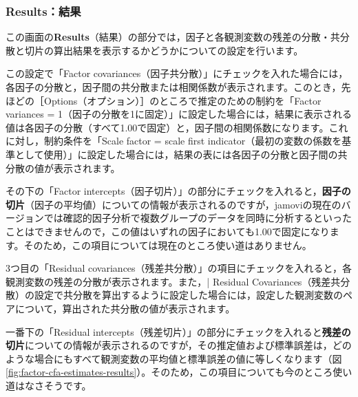 \documentclass[
  12pt,
  a5jpaper,
  lualatex, ja=standard]{bxjsbook}
\begin{document}
\hypertarget{subsub:factor-cfa-covariances}{%
\subsubsection*{Results：結果}\label{subsub:factor-cfa-covariances}}

この画面の\textbf{Results}（結果）の部分では，因子と各観測変数の残差の分散・共分散と切片の算出結果を表示するかどうかについての設定を行います。

この設定で「Factor covariances（因子共分散）」にチェックを入れた場合には，各因子の分散と，因子間の共分散または相関係数が表示されます。このとき，先ほどの［Options（オプション）］のところで推定のための制約を「Factor variances = 1（因子の分散を1に固定）」に設定した場合には，結果に表示される値は各因子の分散（すべて1.00で固定）と，因子間の相関係数になります。これに対し，制約条件を「Scale factor = scale first indicator（最初の変数の係数を基準として使用）」に設定した場合には，結果の表には各因子の分散と因子間の共分散の値が表示されます。

その下の「Factor intercepts（因子切片）」の部分にチェックを入れると，\textbf{因子の切片}（因子の平均値）についての情報が表示されるのですが，jamoviの現在のバージョンでは確認的因子分析で複数グループのデータを同時に分析するといったことはできませんので，この値はいずれの因子においても1.00で固定になります。そのため，この項目については現在のところ使い道はありません。

3つ目の「Residual covariances（残差共分散）」の項目にチェックを入れると，各観測変数の残差の分散が表示されます。また，\colorbox{bar}{\textcolor{gmoji2}{| Residual Covariances}}（残差共分散）の設定で共分散を算出するように設定した場合には，設定した観測変数のペアについて，算出された共分散の値が表示されます。

一番下の「Residual intercepts（残差切片）」の部分にチェックを入れると\textbf{残差の切片}についての情報が表示されるのですが，その推定値および標準誤差は，どのような場合にもすべて観測変数の平均値と標準誤差の値に等しくなります（図\ref{fig:factor-cfa-estimates-results}）。そのため，この項目についても今のところ使い道はなさそうです。
\end{document}
